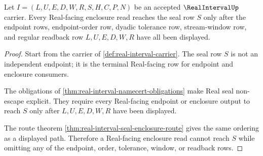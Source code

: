 \begin{theorem}
\label{thm:real-interval-real-seal-nonescape}
Let $I=(L,U,E,D,W,R,S,H,C,P,N)$ be an accepted $\RealIntervalUp$ carrier. Every Real-facing enclosure read reaches the seal row $S$ only after the endpoint rows, endpoint-order row, dyadic tolerance row, stream-window row, and regular readback row $L,U,E,D,W,R$ have all been displayed.
\end{theorem}
\begin{proof}
Start from the carrier of \autoref{def:real-interval-carrier}. The seal row $S$ is not an independent endpoint; it is the terminal Real-facing row for endpoint and enclosure consumers.

The obligations of \autoref{thm:real-interval-namecert-obligations} make Real seal non-escape explicit. They require every Real-facing endpoint or enclosure output to reach $S$ only after $L,U,E,D,W,R$ have been displayed.

The route theorem \autoref{thm:real-interval-seal-enclosure-route} gives the same ordering as a displayed path. Therefore a Real-facing enclosure read cannot reach $S$ while omitting any of the endpoint, order, tolerance, window, or readback rows.
\end{proof}

